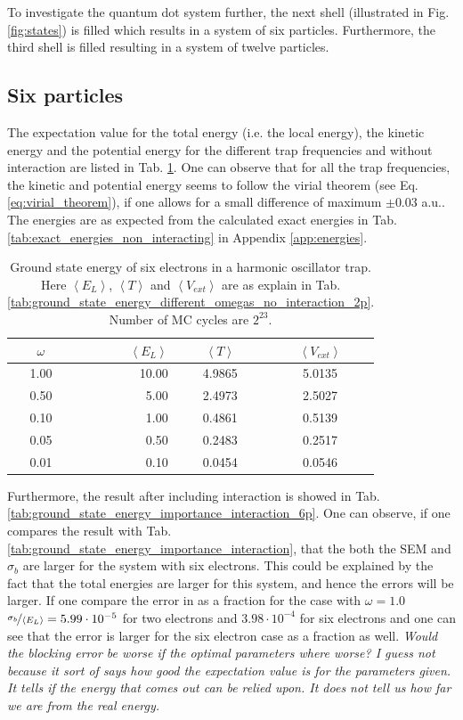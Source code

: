 To investigate the quantum dot system further, the next shell (illustrated in Fig. \ref{fig:states}) is filled which results in a system of six particles. Furthermore, the third shell is filled resulting in a system of twelve particles. 

\subsection{Six particles}

The expectation value for the total energy (i.e. the local energy), the kinetic energy and the potential energy for the different trap frequencies and without interaction are listed in Tab. \ref{tab:ground_state_energy_importance_6p}. One can observe that for all the trap frequencies, the kinetic and potential energy seems to follow the virial theorem (see Eq. \ref{eq:virial_theorem}), if one allows for a small difference of maximum $\pm 0.03$ a.u.. The energies are as expected from the calculated exact energies in Tab.  \ref{tab:exact_energies_non_interacting} in Appendix \ref{app:energies}.

\begin{table}[H]\caption{Ground state energy of six electrons in a harmonic oscillator trap. Here $\left< E_L \right>$, $\left< T \right>$ and $\left< V_{ext}\right>$  are as explain in Tab. \ref{tab:ground_state_energy_different_omegas_no_interaction_2p}. Number of MC cycles are $2^{23}$. }\label{tab:ground_state_energy_importance_6p}
\center
\begin{tabular}{c|rcc}
$\omega$ & $\left< E_L \right>$  & $\left< T \right>$  & $\left< V_{ext}\right>$ \\ \hline
1.00 & 10.00 & 4.9865 & 5.0135\\ 
0.50 & 5.00 & 2.4973 & 2.5027\\
0.10 & 1.00 & 0.4861 & 0.5139\\
0.05 & 0.50 & 0.2483 & 0.2517\\
0.01 & 0.10 & 0.0454 & 0.0546\\
\end{tabular}
\end{table}

Furthermore, the result after including interaction is showed in Tab. \ref{tab:ground_state_energy_importance_interaction_6p}. One can observe, if one compares the result with Tab. \ref{tab:ground_state_energy_importance_interaction}, that the both the SEM and $\sigma_b$ are larger for the system with six electrons. This could be explained by the fact that the total energies are larger for this system, and hence the errors will be larger. If one compare the error in as a fraction for the case with $\omega = 1.0$ $\nicefrac{\sigma_b}{\left< E_L \right>} = 5.99 \cdot 10^{-5}$ for two electrons and $3.98\cdot 10^{-4}$ for six electrons and one can see that the error is larger for the six electron case as a fraction as well. \textit{Would the blocking error be worse if the optimal parameters where worse? I guess not because it sort of says how good the expectation value is for the parameters given. It tells if the energy that comes out can be relied upon. It does not tell us how far we are from the real energy.}

